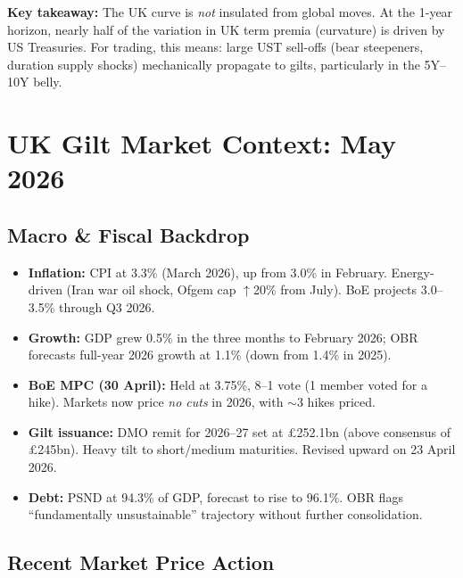 \documentclass[11pt,a4paper]{article}
\begin{document}
\noindent\textbf{Key takeaway:} The UK curve is \textit{not} insulated from global moves. At the 1-year horizon, nearly half of the variation in UK term premia (curvature) is driven by US Treasuries. For trading, this means: large UST sell-offs (bear steepeners, duration supply shocks) mechanically propagate to gilts, particularly in the 5Y--10Y belly.

\newpage


\section*{UK Gilt Market Context: May 2026}

\subsection*{Macro \& Fiscal Backdrop}

\begin{itemize}[nosep, leftmargin=1.2em]
    \item \textbf{Inflation:} CPI at 3.3\% (March 2026), up from 3.0\% in February. Energy-driven (Iran war oil shock, Ofgem cap $\uparrow$20\% from July). BoE projects 3.0--3.5\% through Q3 2026.
    \item \textbf{Growth:} GDP grew 0.5\% in the three months to February 2026; OBR forecasts full-year 2026 growth at 1.1\% (down from 1.4\% in 2025).
    \item \textbf{BoE MPC (30 April):} Held at 3.75\%, 8--1 vote (1 member voted for a hike). Markets now price \textit{no cuts} in 2026, with $\sim$3 hikes priced.
    \item \textbf{Gilt issuance:} DMO remit for 2026--27 set at \pounds252.1bn (above consensus of \pounds245bn). Heavy tilt to short/medium maturities. Revised upward on 23 April 2026.
    \item \textbf{Debt:} PSND at 94.3\% of GDP, forecast to rise to 96.1\%. OBR flags ``fundamentally unsustainable'' trajectory without further consolidation.
\end{itemize}

\subsection*{Recent Market Price Action}
\end{document}
